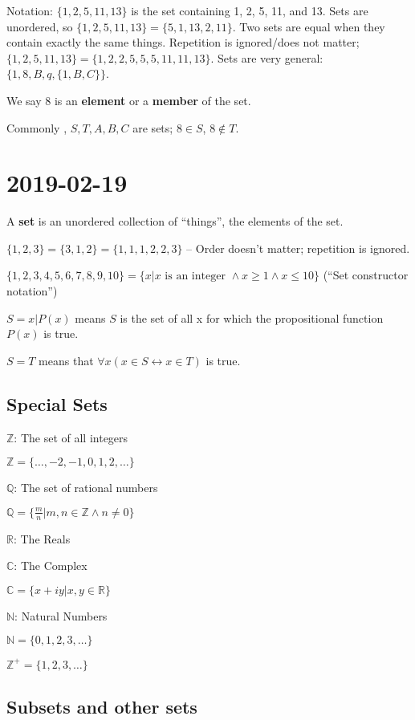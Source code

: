 \documentclass{article}
\theoremstyle{definition}
\begin{document}
Notation: $\{1,2,5,11,13\}$ is the set containing 1, 2, 5, 11, and 13. Sets are
unordered, so $\{1,2,5,11,13\}=\{5,1,13,2,11\}$. Two sets are equal when they
contain exactly the same things. Repetition is ignored/does not matter;
$\{1, 2, 5, 11, 13\}=\{1,2,2,5,5,5,11,11,13\}$. Sets are very general:
$\{1,8,B,q,\{1,B,C\}\}$.

We say 8 is an \textbf{element} or a \textbf{member} of the set.

Commonly , $S,T,A,B,C$ are sets; $8 \in S$, $8 \notin T$.

\section*{2019-02-19}
A \textbf{set} is an unordered collection of ``things'', the elements of the set.

$\{1,2,3\}=\{3,1,2\}=\{1,1,1,2,2,3\}$ -- Order doesn't matter; repetition is
ignored.

$\{1,2,3,4,5,6,7,8,9,10\} = \{x | x \text{ is an integer } \land x \geq 1 \land
x \leq 10 \}$ (``Set constructor notation'')

$S={x|P(x)}$ means $S$ is the set of all x for which the propositional function
$P(x)$ is true.

$S=T$ means that $\forall x (x \in S \leftrightarrow x \in T)$ is true.

\subsection*{Special Sets}

$\mathbb{Z}$: The set of all integers

$\mathbb{Z}=\{\dots,-2,-1,0,1,2,\dots\}$

$\mathbb{Q}$: The set of rational numbers

$\mathbb{Q} = \{ \frac{m}{n} | m,n \in \mathbb{Z} \land n \neq 0 \}$

$\mathbb{R}$: The Reals

$\mathbb{C}$: The Complex

$\mathbb{C}= \{ x + iy | x,y \in \mathbb{R} \}$

$\mathbb{N}$: Natural Numbers

$\mathbb{N}=\{0,1,2,3,\dots\}$

$\mathbb{Z}^+ = \{1,2,3,\dots\}$

\subsection*{Subsets and other sets}
\end{document}
